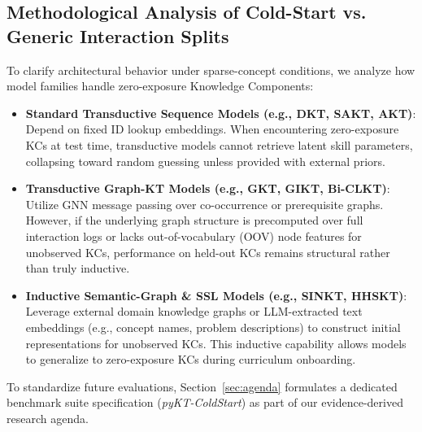 \documentclass[journal]{IEEEtran}
\begin{document}
\subsection{Methodological Analysis of Cold-Start vs. Generic Interaction Splits}
To clarify architectural behavior under sparse-concept conditions, we analyze how model families handle zero-exposure Knowledge Components:
\begin{itemize}
    \item \textbf{Standard Transductive Sequence Models (e.g., DKT, SAKT, AKT)}: Depend on fixed ID lookup embeddings. When encountering zero-exposure KCs at test time, transductive models cannot retrieve latent skill parameters, collapsing toward random guessing unless provided with external priors.
    \item \textbf{Transductive Graph-KT Models (e.g., GKT, GIKT, Bi-CLKT)}: Utilize GNN message passing over co-occurrence or prerequisite graphs. However, if the underlying graph structure is precomputed over full interaction logs or lacks out-of-vocabulary (OOV) node features for unobserved KCs, performance on held-out KCs remains structural rather than truly inductive.
    \item \textbf{Inductive Semantic-Graph \& SSL Models (e.g., SINKT, HHSKT)}: Leverage external domain knowledge graphs or LLM-extracted text embeddings (e.g., concept names, problem descriptions) to construct initial representations for unobserved KCs. This inductive capability allows models to generalize to zero-exposure KCs during curriculum onboarding.
\end{itemize}

To standardize future evaluations, Section~\ref{sec:agenda} formulates a dedicated benchmark suite specification (\emph{pyKT-ColdStart}) as part of our evidence-derived research agenda.
\end{document}
